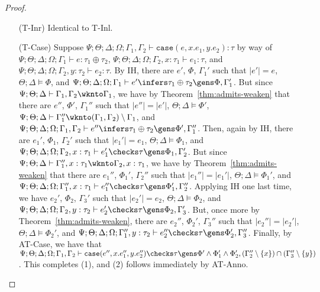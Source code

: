 \begin{proof}
\begin{itemize}
  
  \item[(T-Inr)] Identical to T-Inl.
  \item[(T-Case)] Suppose
  $\Psi ; \Theta ; \Delta ; \Omega ; \Gamma_1,\Gamma_2 \vdash \texttt{case}(e,x.e_1,y.e_2) : \tau$ by way of
  $\Psi ; \Theta ; \Delta ; \Omega ; \Gamma_1 \vdash e : \tau_1 \oplus \tau_2$,
  $\Psi ; \Theta ; \Delta ; \Omega ; \Gamma_2, x: \tau_1 \vdash e_1 : \tau$, and
  $\Psi ; \Theta ; \Delta ; \Omega ; \Gamma_2, y: \tau_2 \vdash e_2 : \tau$.
  By IH, there are $e'$, $\Phi$, $\Gamma_1'$ such that
  $|e'| = e$,
  $\Theta ; \Delta \vDash \Phi$, and
  $\Psi ; \Theta ; \Delta ; \Omega ; \Gamma_1 \vdash e' \infers \tau_1 \oplus \tau_2 \gens \Phi,\Gamma_1'$.
  But since $\Psi ; \Theta ; \Delta \vdash \Gamma_1,\Gamma_2 \wknto \Gamma_1$, we have by Theorem~\ref{thm:admits-weaken}
  that there are $e''$, $\Phi'$, $\Gamma_1''$ such that
  $|e''| = |e'|$,
  $\Theta ; \Delta \vDash \Phi'$,
  $\Psi ; \Theta ; \Delta \vdash \Gamma_1'' \wknto (\Gamma_1,\Gamma_2) \setminus \Gamma_1$, and
  $\Psi ; \Theta ; \Delta ; \Omega ; \Gamma_1,\Gamma_2 \vdash e'' \infers \tau_1 \oplus \tau_2 \gens \Phi',\Gamma_1''$.
  Then, again by IH, there are $e_1'$, $\Phi_1$, $\Gamma_2'$ such that
  $|e_1'| = e_1$,
  $\Theta ; \Delta \vDash \Phi_1$, and
  $\Psi ; \Theta ; \Delta ; \Omega ; \Gamma_2, x : \tau_1 \vdash e_1' \checks \tau \gens \Phi_1,\Gamma_2'$.
  But since
  $\Psi ; \Theta ; \Delta \vdash \Gamma_1'', x : \tau_1 \wknto \Gamma_2, x : \tau_1$,
  we have by Theorem~\ref{thm:admits-weaken} that there are $e_1''$, $\Phi_1'$, $\Gamma_2''$ such that
  $|e_1''| = |e_1'|$,
  $\Theta ; \Delta \vDash \Phi_1'$, and
  $\Psi ; \Theta ; \Delta ; \Omega ; \Gamma_1'', x : \tau_1 \vdash e_1'' \checks \tau \gens \Phi_1',\Gamma_2''$.
  Applying IH one last time, we have $e_2'$, $\Phi_2$, $\Gamma_3'$ such that
  $|e_2'| = e_2$,
  $\Theta ; \Delta \vDash \Phi_2$, and
  $\Psi ; \Theta ; \Delta ; \Omega ; \Gamma_2, y : \tau_2 \vdash e_2' \checks \tau \gens \Phi_2,\Gamma_3'$.
  But, once more by Theorem~\ref{thm:admits-weaken}, there are $e_2''$, $\Phi_2'$, $\Gamma_3''$ such that
  $|e_2''| = |e_2'|$,
  $\Theta ; \Delta \vDash \Phi_2'$, and
  $\Psi ; \Theta ; \Delta ; \Omega ; \Gamma_1'', y : \tau_2 \vdash e_2'' \checks \tau \gens \Phi_2',\Gamma_3''$.
  Finally, by AT-Case, we have that
  $\Psi ; \Theta ; \Delta ; \Omega ; \Gamma_1,\Gamma_2 \vdash \texttt{case}(e'',x.e_1'',y.e_2'') \checks \tau \gens \Phi' \wedge \Phi_1' \wedge \Phi_2',(\Gamma_2'' \setminus \{x\}) \cap (\Gamma_3'' \setminus \{y\})$.
  This completes (1), and (2) follows immediately by AT-Anno.
  

\end{itemize}
\end{proof}
